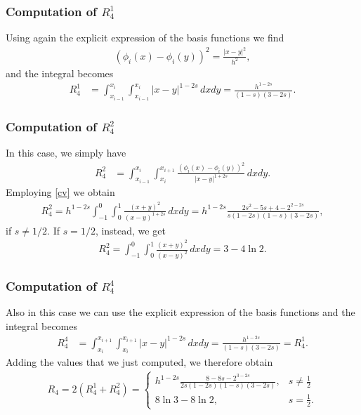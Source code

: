 {\subsubsection*{Computation of $R_4^1$}
Using again the explicit expression of the basis functions we find 
\begin{align*}
	(\phi_i(x)-\phi_i(y))^2 = \frac{|x-y|^2}{h^2},
\end{align*}
and the integral becomes
\begin{align*}
	R_4^1 &= \int_{x_{i-1}}^{x_i}\int_{x_{i-1}}^{x_i} |x-y|^{1-2s}\,dxdy = \frac{h^{1-2s}}{(1-s)(3-2s)}. 
\end{align*}

\subsubsection*{Computation of $R_4^2$}
In this case, we simply have
\begin{align*}
	R_4^2 &= \int_{x_{i-1}}^{x_i}\int_{x_i}^{x_{i+1}} \frac{(\phi_i(x)-\phi_i(y))^2}{|x-y|^{1+2s}}\,dxdy.
\end{align*}
Employing \eqref{cv} we obtain
\begin{align*}
	R_4^2 = h^{1-2s}\int_{-1}^0\int_0^1 \frac{(x+y)^2}{(x-y)^{1+2s}}\,dxdy = h^{1-2s}\frac{2s^2-5s+4-2^{2-2s}}{s(1-2s)(1-s)(3-2s)}, 
\end{align*}
if $s\neq 1/2$. If $s=1/2$, instead, we get
\begin{align*}
	R_4^2 = \int_{-1}^0\int_0^1 \frac{(x+y)^2}{(x-y)^2}\,dxdy = 3-4\ln 2.
\end{align*}
\subsubsection*{Computation of $R_4^4$}
Also in this case we can use the explicit expression of the basis functions and the integral becomes
\begin{align*}
	R_4^4 &= \int_{x_i}^{x_{i+1}}\int_{x_i}^{x_{i+1}} |x-y|^{1-2s}\,dxdy = \frac{h^{1-2s}}{(1-s)(3-2s)}=R_4^1. 
\end{align*}
Adding the values that we just computed, we therefore obtain
\begin{align*}
	R_4 = 2(R_4^1+R_4^2) = \begin{cases}
					\displaystyle h^{1-2s}\frac{8-8s-2^{3-2s}}{2s(1-2s)(1-s)(3-2s)}, & \displaystyle s\neq \frac{1}{2}
					\\
					8\ln 3-8\ln 2, & \displaystyle s=\frac{1}{2}.
				\end{cases}	
\end{align*}

}

